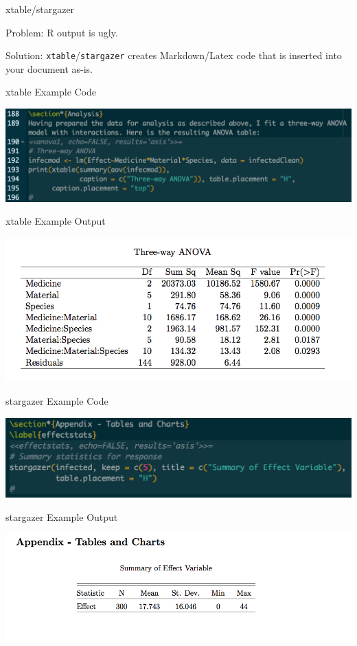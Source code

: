 \begin{frame}{xtable/stargazer}

Problem: R output is ugly.

Solution: \texttt{xtable}/\texttt{stargazer} creates Markdown/Latex code
that is inserted into your document as-is.

\end{frame}

\begin{frame}{xtable Example Code}

\includegraphics{images/xtable1.png}

\end{frame}

\begin{frame}{xtable Example Output}

\includegraphics{images/xtable2.png}

\end{frame}

\begin{frame}{stargazer Example Code}

\includegraphics{images/stargazer1.png}

\end{frame}

\begin{frame}{stargazer Example Output}

\includegraphics{images/stargazer2.png}

\end{frame}

